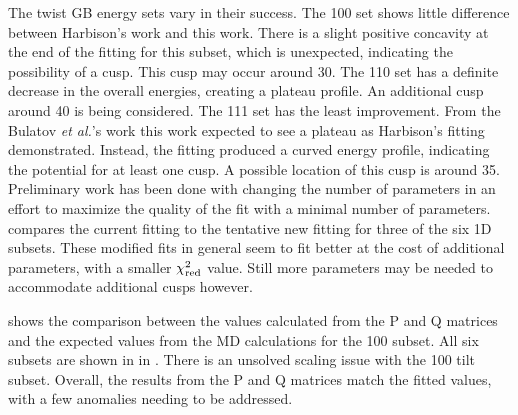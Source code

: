 \documentclass[12pt]{report}
\begin{document}
The twist GB energy sets vary in their success.  The \textlangle{}100\textrangle{} set shows little difference between Harbison's \cite{harbison2015} work and this work.  There is a slight positive concavity at the end of the fitting for this subset, which is unexpected, indicating the possibility of a cusp.  This cusp may occur around 30\textdegree{}.  The \textlangle{}110\textrangle{} set has a definite decrease in the overall energies, creating a plateau profile.  An additional cusp around 40\textdegree{} is being considered.  The \textlangle{}111\textrangle{} set has the least improvement.  From the Bulatov \emph{et al.}'s work\cite{bulatov2014} this work expected to see a plateau as Harbison's fitting demonstrated.\cite{harbison2015}  Instead, the fitting produced a curved energy profile, indicating the potential for at least one cusp.  A possible location of this cusp is around 35\textdegree{}.  Preliminary work has been done with changing the number of parameters in an effort to maximize the quality of the fit with a minimal number of parameters.  compares the current fitting to the tentative new fitting for three of the six 1D subsets.  These modified fits in general seem to fit better at the cost of additional parameters, with a smaller $\chi_{\textnormal{red}}^2$ value.  Still more parameters may be needed to accommodate additional cusps however.

 shows the comparison between the values calculated from the P and Q matrices and the expected values from the MD calculations for the \textlangle{}100\textrangle{} subset.  All six subsets are shown in  in .  There is an unsolved scaling issue with the \textlangle{}100\textrangle{} tilt subset.  Overall, the results from the P and Q matrices match the fitted values, with a few anomalies needing to be addressed.
\end{document}
